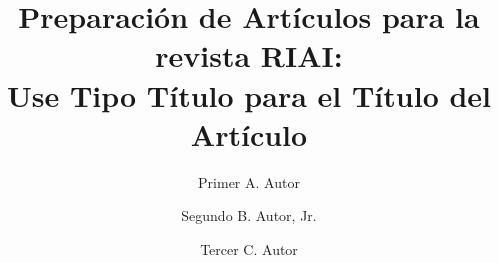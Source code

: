 \documentclass[final,5p,times,twocolumn,authoryear,10pt]{elsarticle}
\begin{document}
\fontsize{9.5pt}{11.4pt}\selectfont
\begin{frontmatter}






\title{
\fontsize{15pt}{18pt}\selectfont
Preparación de Artículos para la revista RIAI:\\
Use Tipo Título para el Título del Artículo}



\author[First]{Primer A. Autor}

\author[Second]{Segundo B. Autor, Jr.}

\author[Third]{Tercer C. Autor}




\address[First]{
\fontsize{7.5pt}{11.4pt}\selectfont
Comité Español de Automática, Parc Tecnologic de Barcelona, Edifici U, C/ Llorens i Artigas, 4-6, 08028 Barcelona, España}
\address[Second]{
\fontsize{7.5pt}{11.4pt}\selectfont
Departamento de Automática, Ingeniería Electrónica e Informática,Universidad Politécnica de Madrid, C/ José Gutiérrez Abascal, nº2, 28006, Madrid, España}
\address[Third]{
\fontsize{7.5pt}{11.4pt}\selectfont
Robotics Lab, Departmento de Ingeniería de Sistemas y Automática, Universidad Carlos III de Madrid, Avda. de la Universidad 30, 28911 Leganés, España}



\end{frontmatter}
\end{document}
